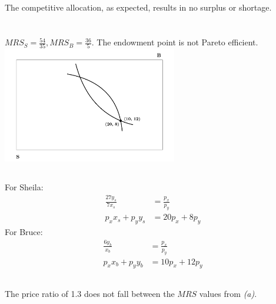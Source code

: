 \documentclass{article}
\begin{document}
	\subsection[c]{}
		The competitive allocation, as expected, results in no surplus or shortage.
\section[5]{}
	\subsection[a]{}
		$MRS_S = \frac{54}{35}, MRS_B = \frac{36}{5}$. The endowment point is not Pareto efficient. \\
		\includegraphics[height=2in]{Charts/5a}
	\subsection[b]{}
		For Sheila: 
		\setcounter{equation}{0}
		\begin{align}
			\frac{27y_s}{7x_s} &= \frac{p_x}{p_y}\\
			p_x x_s + p_y y_s &= 20p_x+8p_y
		\end{align}
		For Bruce: 
		\begin{align}
			\frac{6y_b}{x_b} &= \frac{p_x}{p_y}\\
			p_x x_b + p_y y_b &= 10p_x+12p_y
		\end{align}
	\subsection[c]{}
		The price ratio of 1.3 does not fall between the $MRS$ values from \textit{(a)}.
\end{document}
